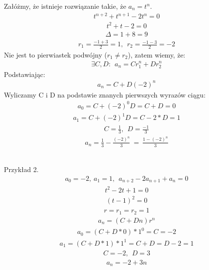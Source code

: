 \documentclass[main.tex]{subfiles}
\begin{document}
    Załóżmy, że istnieje rozwiązanie takie, że $a_n = t^n$.
    \begin{align*}
        t^{n+2} + t^{n+1} - 2 t^n = 0
    \end{align*}
    \begin{align*}
        t^2 + t - 2 = 0
    \end{align*}
    \begin{align*}
        \Delta = 1 + 8 = 9
    \end{align*}
    \begin{align*}
        r_1 = \frac{-1 + 3}{2} = 1, ~~ r_2 = \frac{-1 - 3}{2} = -2
    \end{align*}
    Nie jest to pierwiastek podwójny ($r_1 \neq r_2$), zatem wiemy, że:
    \begin{align*}
        \exists C, D: ~~ a_n = C r_1^n + D r_2^n
    \end{align*}
    Podstawiając:
    \begin{align*}
        a_n = C + D (-2)^n
    \end{align*}
    Wyliczamy C i D na podstawie znanych pierwszych wyrazów ciągu:
    \begin{align*}
        a_0 = C + (-2)^0 D = C + D = 0
    \end{align*}
    \begin{align*}
        a_1 = C + (-2)^1 D = C - 2*D = 1
    \end{align*}
    \begin{align*}
        C = \frac{1}{3}, ~~ D = \frac{-1}{3}
    \end{align*}
    \begin{align*}
        a_n = \frac{1}{3} - \frac{(-2)^n}{3} ~ = ~ \frac{1 - (-2)^n}{3}
    \end{align*}

    \hfill \\

    Przykład 2.
    \begin{align*}
        a_0 = -2, ~ a_1 = 1, ~~ a_{n+2} - 2 a_{n+1} + a_n = 0
    \end{align*}
    \begin{align*}
        t^2 - 2t + 1 = 0
    \end{align*}
    \begin{align*}
        (t - 1)^2 = 0
    \end{align*}
    \begin{align*}
        r = r_1 = r_2 = 1
    \end{align*}
    \begin{align*}
        a_n = (C + Dn)r^n
    \end{align*}
    \begin{align*}
        a_0 = (C + D*0)*1^0 = C = -2
    \end{align*}
    \begin{align*}
        a_1 = (C + D*1)*1^1 = C + D = D - 2 = 1
    \end{align*}
    \begin{align*}
        C = -2, ~~ D = 3
    \end{align*}
    \begin{align*}
        a_n = -2 + 3n
    \end{align*}
\end{document}
